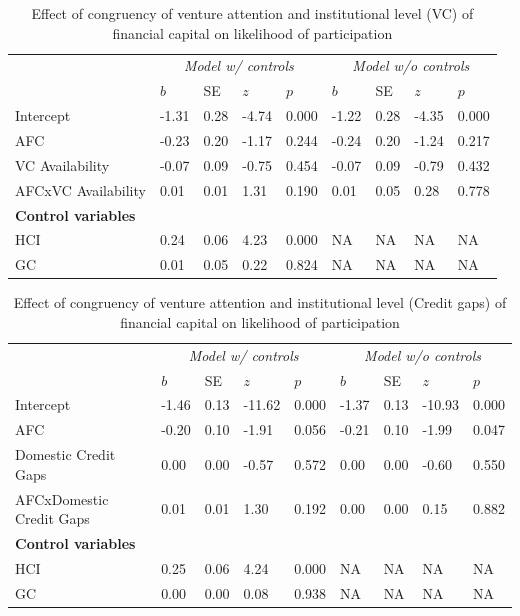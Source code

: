 \documentclass[
  english,
  man]{apa6}
\begin{document}
\begin{table}

\caption{\label{tab:unnamed-chunk-18}Effect of congruency of venture attention and institutional level (VC) of financial capital on likelihood of participation}
\centering
\begin{tabular}[t]{l|l|l|l|l|l|l|l|l}
\hline
\multicolumn{1}{c|}{\em{ }} & \multicolumn{4}{c|}{\em{Model w/ controls}} & \multicolumn{4}{c}{\em{Model w/o controls}} \\
\cline{2-5} \cline{6-9}
  & $b$ & SE & $z$ & $p$ & $b$ & SE & $z$ & $p$\\
\hline
Intercept & -1.31 & 0.28 & -4.74 & 0.000 & -1.22 & 0.28 & -4.35 & 0.000\\
\hline
AFC & -0.23 & 0.20 & -1.17 & 0.244 & -0.24 & 0.20 & -1.24 & 0.217\\
\hline
VC Availability & -0.07 & 0.09 & -0.75 & 0.454 & -0.07 & 0.09 & -0.79 & 0.432\\
\hline
AFCxVC Availability & 0.01 & 0.01 & 1.31 & 0.190 & 0.01 & 0.05 & 0.28 & 0.778\\
\hline
\multicolumn{9}{l}{\textbf{Control variables}}\\
\hline
\hspace{1em}HCI & 0.24 & 0.06 & 4.23 & 0.000 & NA & NA & NA & NA\\
\hline
\hspace{1em}GC & 0.01 & 0.05 & 0.22 & 0.824 & NA & NA & NA & NA\\
\hline
\end{tabular}
\end{table}

\begin{table}

\caption{\label{tab:unnamed-chunk-18}Effect of congruency of venture attention and institutional level (Credit gaps) of financial capital on likelihood of participation}
\centering
\begin{tabular}[t]{l|l|l|l|l|l|l|l|l}
\hline
\multicolumn{1}{c|}{\em{ }} & \multicolumn{4}{c|}{\em{Model w/ controls}} & \multicolumn{4}{c}{\em{Model w/o controls}} \\
\cline{2-5} \cline{6-9}
  & $b$ & SE & $z$ & $p$ & $b$ & SE & $z$ & $p$\\
\hline
Intercept & -1.46 & 0.13 & -11.62 & 0.000 & -1.37 & 0.13 & -10.93 & 0.000\\
\hline
AFC & -0.20 & 0.10 & -1.91 & 0.056 & -0.21 & 0.10 & -1.99 & 0.047\\
\hline
Domestic Credit Gaps & 0.00 & 0.00 & -0.57 & 0.572 & 0.00 & 0.00 & -0.60 & 0.550\\
\hline
AFCxDomestic Credit Gaps & 0.01 & 0.01 & 1.30 & 0.192 & 0.00 & 0.00 & 0.15 & 0.882\\
\hline
\multicolumn{9}{l}{\textbf{Control variables}}\\
\hline
\hspace{1em}HCI & 0.25 & 0.06 & 4.24 & 0.000 & NA & NA & NA & NA\\
\hline
\hspace{1em}GC & 0.00 & 0.00 & 0.08 & 0.938 & NA & NA & NA & NA\\
\hline
\end{tabular}
\end{table}
\end{document}
